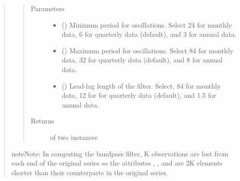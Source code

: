 \documentclass[letterpaper,10pt,openany,oneside,english]{sphinxmanual}
\begin{document}
\begin{fulllineitems}
\begin{quote}
\begin{fulllineitems}
\begin{quote}
\end{quote}
\begin{quote}\begin{description}
\item[{Parameters}] \leavevmode\begin{itemize}
\item {} 
 () \textendash{} Minimum period for oscillations. Select 24 for monthly data, 6 for quarterly data (default), and 3 for annual data.

\item {} 
 () \textendash{} Maximum period for oscillations. Select 84 for monthly data, 32 for quarterly data (default), and 8 for annual data.

\item {} 
 () \textendash{} Lead-lag length of the filter. Select, 84 for monthly data, 12 for for quarterly data (default), and 1.5 for annual data.

\end{itemize}

\item[{Returns}] \leavevmode
{} of two {\hyperref[\detokenize{series_class:fredpy.series}]{}} instances

\end{description}\end{quote}

\begin{sphinxadmonition}{note}{Note:}
In computing the bandpass filter, K observations are lost from each end of the original series so the attributes , , and  are 2K elements shorter than their counterparts in the original series.
\end{sphinxadmonition}

\end{fulllineitems}


\end{quote}
\end{fulllineitems}
\end{document}
